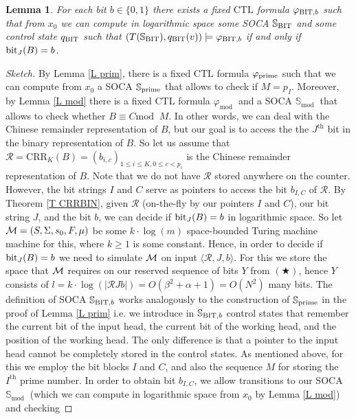 \documentclass[times,envcountsame]{llncs}
\newtheorem{lemma}[theorem]{{\bf Lemma}}
\renewcommand{\mod}{\text{mod }}
\def\CRR{{\mathrm{CRR}}}
\newcommand{\Soca}{\mathbb{S}}
\newcommand{\ctl}{\text{CTL}}
\begin{document}
\begin{lemma}{\label{L BIT}}
For each bit $b\in\{0,1\}$ there exists a fixed $\ctl$ formula $\varphi_{\text{BIT},b}$
such that from $x_0$
we can compute in logarithmic space some SOCA $\Soca_{\BIT}$ and some
control state $q_{\text{BIT}}$ such that
$(T(\Soca_\BIT),q_\BIT(v))\models\varphi_{\BIT,b}$
if and only if $\text{bit}_J(B)=b$.
\end{lemma}
\renewcommand{\C}{\mathcal{C}}
\renewcommand{\R}{\mathcal{R}}
\begin{proof}[Sketch]
By Lemma \ref{L prim}, there is a fixed $\ctl$
formula $\varphi_{\text{prime}}$ such that we can compute from $x_0$ a
SOCA $\Soca_\prim$ that allows to check if $M=p_I$.
Moreover, by Lemma \ref{L mod} there is a fixed $\ctl$
formula $\varphi_\mod$ and a SOCA $\Soca_\mod$ that allows
to check whether $B\equiv C \mod\ M$.
In other words, we can deal with the Chinese remainder representation
of $B$, but our goal is to access the the $J^{\text{th}}$ bit in the
binary representation of $B$.
So let us assume that $\R=\CRR_{K}(B)=(b_{i,c})_{1\leq i\leq K,0\leq c<p_i}$
is the Chinese remainder representation of $B$.
Note that we do not have $\R$ stored anywhere on the counter.
However, the bit strings $I$ and $C$ serve as pointers to access the
bit $b_{I,C}$ of $\R$.
By Theorem \ref{T CRRBIN}, given $\R$ (on-the-fly by our pointers $I$ and $C$), our
bit string $J$, and the bit $b$,
we can decide if $\text{bit}_J(B)=b$ in logarithmic space.
So let $\mathcal{M}=(S,\Sigma,s_0,F,\mu)$ be some $k\cdot\log(m)$ space-bounded
Turing machine machine for this, where $k\geq 1$ is some constant.
Hence, in order to decide if
$\text{bit}_J(B)=b$ we need to simulate $\mathcal{M}$ on input $\langle \R, J, b\rangle$.
For this we store the space that $\mathcal{M}$ requires on our reserved
sequence of bits $Y$ from $(\bigstar)$, hence $Y$ consists of
$l=k\cdot\log(|\R Jb|)=O(\beta^2+\alpha+1)=O(N^2)$ many bits.
The definition of SOCA $\Soca_{\BIT,b}$ works analogously to the construction
of $\Soca_{\prim}$ in the proof of Lemma \ref{L prim}
i.e. we introduce in $\Soca_{\BIT,b}$ control states
that remember the current bit of the input head, the current bit of
the working head, and the position of the working head.
The only difference is that a pointer to the input head cannot be
completely stored
in the control states.
As mentioned above, for this we employ the bit blocks $I$ and $C$,
and also the sequence $M$ for storing the $I^{\text{th}}$ prime number.
In order to obtain bit $b_{I,C}$, we allow transitions to our SOCA $\Soca_\mod$
(which we can compute in logarithmic
space from $x_0$ by Lemma \ref{L mod}) and checking

\end{proof}
\end{document}
